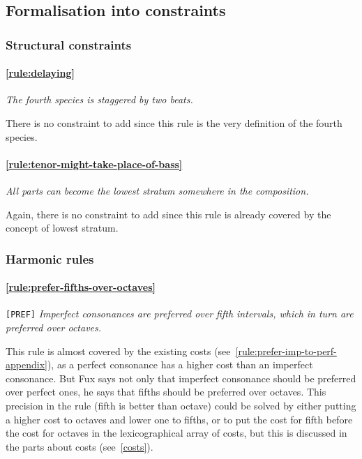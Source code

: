 \begin{enumerate}[wide, label=\bfseries 4.P\arabic*]
\end{enumerate}

\subsection{Formalisation into constraints}\label{formalisation-c-4th}
\subsubsection{Structural constraints}
    \paragraph{\hspace{.5cm}\ref{rule:delaying}} \textit{The fourth species is staggered by two beats.}

    There is no constraint to add since this rule is the very definition of the fourth species.

    \paragraph{\hspace{.5cm}\ref{rule:tenor-might-take-place-of-bass}} \textit{All parts can become the lowest stratum somewhere in the composition.} 
    
    Again, there is no constraint to add since this rule is already covered by the concept of lowest stratum.


\subsubsection{Harmonic rules}
\paragraph{\hspace{.6cm}\ref{rule:prefer-fifths-over-octaves}} \texttt{[PREF]} \textit{Imperfect consonances are preferred over fifth intervals, which in turn are preferred over octaves.}   

    This rule is almost covered by the existing costs (see~\ref{rule:prefer-imp-to-perf-appendix}), as a perfect consonance has a higher cost than an imperfect consonance. But Fux says not only that imperfect consonance should be preferred over perfect ones, he says that fifths should be preferred over octaves. This precision in the rule (fifth is better than octave) could be solved by either putting a higher cost to octaves and lower one to fifths, or to put the cost for fifth before the cost for octaves in the lexicographical array of costs, but this is discussed in the parts about costs (see~\ref{costs}).


